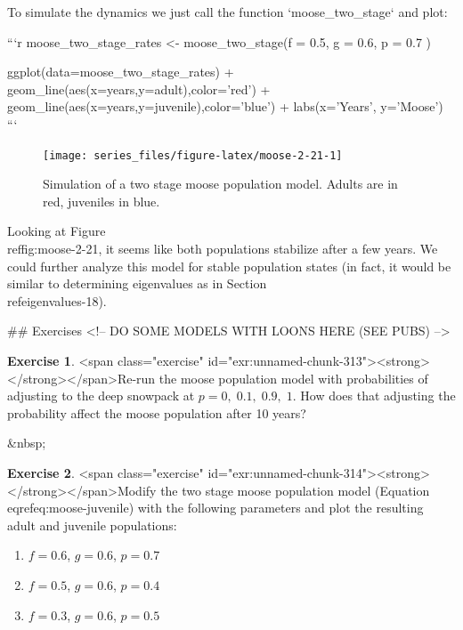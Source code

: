 \documentclass[
]{book}
\theoremstyle{definition}
\theoremstyle{definition}
\theoremstyle{definition}
\newtheorem{exercise}{Exercise}[chapter]
\theoremstyle{remark}
\begin{document}
To simulate the dynamics we just call the function `moose_two_stage` and plot:


```r
moose_two_stage_rates <- moose_two_stage(f = 0.5,
                                         g = 0.6,
                                         p = 0.7
                                         )

ggplot(data=moose_two_stage_rates) +
  geom_line(aes(x=years,y=adult),color='red') +
  geom_line(aes(x=years,y=juvenile),color='blue') +
  labs(x='Years',
     y='Moose')
```

\begin{figure}

{\centering \texttt{[image: series\_files/figure-latex/moose-2-21-1]} 

}

\caption{Simulation of a two stage moose population model. Adults are in red, juveniles in blue.}\label{fig:moose-2-21}
\end{figure}

Looking at Figure \\ref{fig:moose-2-21}, it seems like both populations stabilize after a few years. We could further analyze this model for stable population states (in fact, it would be similar to determining eigenvalues as in Section \\ref{eigenvalues-18}).

\newpage

## Exercises
<!-- DO SOME MODELS WITH LOONS HERE (SEE PUBS) -->
\begin{exercise}
<span class="exercise" id="exr:unnamed-chunk-313"><strong>\label{exr:unnamed-chunk-313} </strong></span>Re-run the moose population model with probabilities of adjusting to the deep snowpack at $p = 0, \; 0.1, \; 0.9, \;1$.  How does that adjusting the probability affect the moose population after 10 years?
\end{exercise}

&nbsp;

\begin{exercise}
<span class="exercise" id="exr:unnamed-chunk-314"><strong>\label{exr:unnamed-chunk-314} </strong></span>Modify the two stage moose population model (Equation \\eqref{eq:moose-juvenile}) with the following parameters and plot the resulting adult and juvenile populations:
  
  \begin{enumerate}[label=\alph*.]
\item $f = 0.6$, $g = 0.6 $, $p = 0.7$
  \item $f = 0.5$, $g = 0.6 $, $p = 0.4$
  \item $f = 0.3$, $g = 0.6 $, $p = 0.5$
\end{enumerate}
  
\end{exercise}
\end{document}
